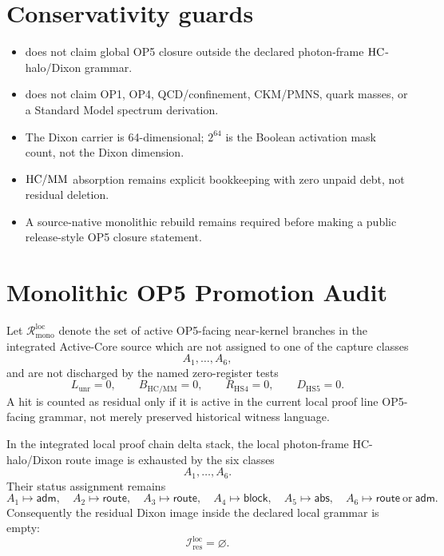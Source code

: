 \section{Conservativity guards}

\begin{itemize}
\item does not claim global OP5 closure outside the declared
photon-frame \(\mathrm{HC}\)-halo/Dixon grammar.
\item does not claim OP1, OP4, QCD/confinement, CKM/PMNS, quark masses, or a
Standard Model spectrum derivation.
\item The Dixon carrier is 64-dimensional; \(2^{64}\) is the Boolean activation
mask count, not the Dixon dimension.
\item \(\mathrm{HC}/\mathrm{MM}\) absorption remains explicit bookkeeping with zero unpaid debt,
not residual deletion.
\item A source-native monolithic rebuild remains required before making a public
release-style OP5 closure statement.
\end{itemize}


\clearpage
\section*{Monolithic OP5 Promotion Audit}

\begin{definition}
Let \(\mathcal R_{\mathrm{mono}}^{\mathrm{loc}}\) denote the set of active OP5-facing near-kernel branches in the integrated Active-Core source which are not assigned to one of the capture classes
\[
A_1,\ldots,A_6,
\]
and are not discharged by the named zero-register tests
\[
L_{\mathrm{unr}}=0,\qquad B_{\mathrm{HC/MM}}=0,
\qquad R_{\mathrm{HS4}}=0,
\qquad D_{\mathrm{HS5}}=0.
\]
A hit is counted as residual only if it is active in the current local proof line OP5-facing grammar, not merely preserved historical witness language.
\end{definition}

\begin{proposition}
In the integrated local proof chain delta stack, the local photon-frame HC-halo/Dixon route image is exhausted by the six classes
\[
A_1,\ldots,A_6.
\]
Their status assignment remains
\[
A_1\mapsto \mathsf{adm},\quad
A_2\mapsto \mathsf{route},\quad
A_3\mapsto \mathsf{route},\quad
A_4\mapsto \mathsf{block},\quad
A_5\mapsto \mathsf{abs},\quad
A_6\mapsto \mathsf{route}\ \text{or}\ \mathsf{adm}.
\]
Consequently the residual Dixon image inside the declared local grammar is empty:
\[
\mathcal I_{\mathrm{res}}^{\mathrm{loc}}=\varnothing.
\]
\end{proposition}

